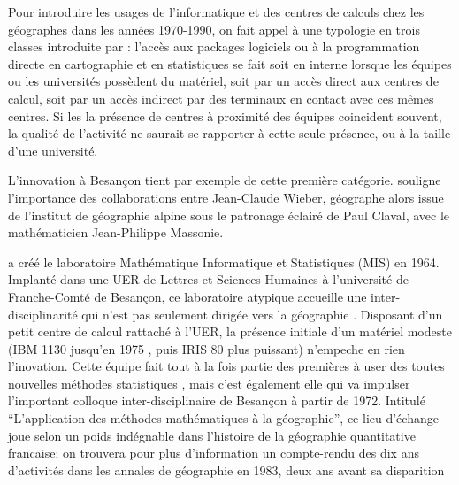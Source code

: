 Pour introduire les usages de l'informatique et des centres de calculs chez les géographes dans les années 1970-1990, on fait appel à une typologie en trois classes introduite par \textcites{Wieber1980}[448]{Joliveau2004} : l’accès aux packages logiciels ou à la programmation directe en cartographie et en statistiques se fait soit en interne lorsque les équipes ou les universités possèdent du matériel, soit par un accès direct aux centres de calcul, soit par un accès indirect par des terminaux en contact avec ces mêmes centres. Si les la présence de centres à proximité des équipes coincident souvent, la qualité de l'activité ne saurait se rapporter à cette seule présence, ou à la taille d'une université.

L'innovation à Besançon tient par exemple de cette première catégorie. \textcite[131]{Cuyala2014} souligne l’importance des collaborations entre Jean-Claude Wieber, géographe alors issue de l’institut de géographie alpine sous le patronage éclairé de Paul Claval, avec le mathématicien Jean-Philippe Massonie.

\textcite{Massonie1986} a créé le laboratoire Mathématique Informatique et Statistiques (MIS) en 1964. Implanté dans une UER de Lettres et Sciences Humaines à l’université de Franche-Comté de Besançon, ce laboratoire atypique accueille une inter-disciplinarité qui n'est pas seulement dirigée vers la géographie . Disposant d’un petit centre de calcul rattaché à l'UER, la présence initiale d'un matériel modeste (IBM 1130 jusqu'en 1975 \autocite[22]{Wieber1980}, puis IRIS 80 plus puissant) n'empeche en rien l'inovation. Cette équipe fait tout à la fois partie des premières à user des toutes nouvelles méthodes statistiques \autocite{Massonie1971}, mais c'est également elle qui va impulser l'important colloque inter-disciplinaire de Besançon à partir de 1972. Intitulé \enquote{L'application des méthodes mathématiques à la géographie}, ce lieu d'échange joue selon \autocite[331]{Cuyala2014} un poids indégnable dans l'histoire de la géographie quantitative francaise; on trouvera pour plus d'information un compte-rendu des dix ans d'activités dans les annales de géographie en 1983, deux ans avant sa disparition \autocite{Massonie1983}

